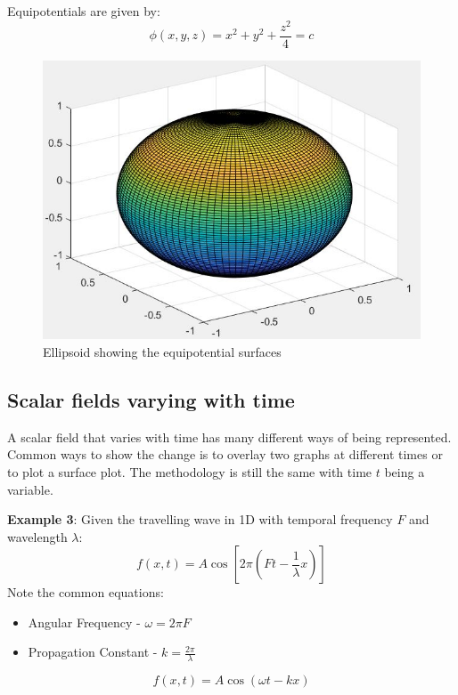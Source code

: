 \documentclass[10pt,a4paper]{article}
\begin{document}
Equipotentials are given by:
$$
    \phi(x,y,z) = x^2 + y^2 + \frac{z^2}{4} = c
$$
\begin{figure} [h!]
    \centering
    \includegraphics[scale=0.6]{Ellipsoid.JPG}
    \caption{Ellipsoid showing the equipotential surfaces}
\end{figure}

\subsection{Scalar fields varying with time}

A scalar field that varies with time has many different ways of being represented. Common ways to
show the change is to overlay two graphs at different times or to plot a surface plot. The methodology
is still the same with time $t$ being a variable.

\textbf{Example 3}: Given the travelling wave in 1D with temporal frequency $F$ and wavelength
$\lambda$:
$$
    f(x,t) = A\cos\left[2\pi \left(Ft - \frac{1}{\lambda}x \right)\right]
$$
Note the common equations: 
\begin{itemize}
    \item Angular Frequency - $\omega = 2\pi F$
    \item Propagation Constant - $k=\frac{2\pi}{\lambda}$
\end{itemize}
$$
    f(x,t)=A\cos(\omega t - kx)
$$
\end{document}

